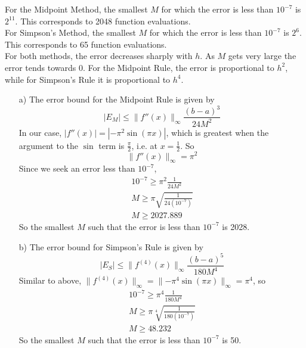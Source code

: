 \documentclass[letterpaper,12pt]{article} %
\begin{document}
\begin{enumerate}
{    For the Midpoint Method, the smallest \(M\) for which the error is less than \(10^{-7}\) is \(2^{11}\). This corresponds to 2048 function evaluations.\\
    For Simpson's Method, the smallest \(M\) for which the error is less than \(10^{-7}\) is \(2^{6}\). This corresponds to 65 function evaluations.\\

    For both methods, the error decreases sharply with \(h\). As \(M\) gets very large the error tends towards 0. For the Midpoint Rule, the error is proportional to \(h^2\), while for Simpson's Rule it is proportional to \(h^4\).

    \begin{enumerate}
      \newcommand{\norm}[1]{\lVert#1\rVert}
      \item[a)] {
        The error bound for the Midpoint Rule is given by\cite{errorbound}
        \[ |E_M| \leq \norm{f''(x)}_\infty \frac{(b-a)^3}{24M^2} \]
        In our case, \( |f''(x)| = |-\pi^2 \sin(\pi x)| \), which is greatest when the argument to the \(\sin\) term is \(\frac{\pi}{2}\), i.e. at \(x = \frac{1}{2}\). So
        \[ \norm{f''(x)}_\infty = \pi^2 \]
        Since we seek an error less than \(10^{-7}\),
        \begin{gather*}
          10^{-7} \geq \pi^2\frac{1}{24M^2} \\
          M \geq \pi\sqrt{\frac{1}{24(10^{-7})}} \\
          M \geq 2027.889
        \end{gather*}
        So the smallest \(M\) such that the error is less than \(10^{-7}\) is 2028.
      }
      
      \item[b)] {
        The error bound for Simpson's Rule is given by\cite{errorbound}
        \[ |E_S| \leq \norm{f^{(4)}(x)}_\infty \frac{(b-a)^5}{180M^4} \]
        Similar to above, \( \norm{f^{(4)}(x)}_\infty = \norm{-\pi^4 \sin(\pi x)}_\infty = \pi^4 \), so 
        \begin{gather*}
          10^{-7} \geq \pi^4 \frac{1}{180M^4} \\
          M \geq \pi\sqrt[4]{\frac{1}{180(10^{-7})}} \\
          M \geq 48.232
        \end{gather*}
        So the smallest \(M\) such that the error is less than \(10^{-7}\) is 50.
      }
    \end{enumerate}
  }

\end{enumerate}

\medskip
\printbibliography
\end{document}
